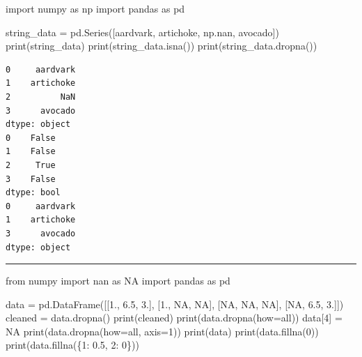 \documentclass[
  polish,
  letterpaper,
  DIV=11,
  numbers=noendperiod]{scrreprt}
\newenvironment{Shaded}{\begin{snugshade}}{\end{snugshade}}
\newcommand{\BuiltInTok}[1]{\textcolor[rgb]{0.00,0.23,0.31}{#1}}
\newcommand{\DecValTok}[1]{\textcolor[rgb]{0.68,0.00,0.00}{#1}}
\newcommand{\FloatTok}[1]{\textcolor[rgb]{0.68,0.00,0.00}{#1}}
\newcommand{\ImportTok}[1]{\textcolor[rgb]{0.00,0.46,0.62}{#1}}
\newcommand{\NormalTok}[1]{\textcolor[rgb]{0.00,0.23,0.31}{#1}}
\newcommand{\OperatorTok}[1]{\textcolor[rgb]{0.37,0.37,0.37}{#1}}
\newcommand{\StringTok}[1]{\textcolor[rgb]{0.13,0.47,0.30}{#1}}
\begin{document}
\begin{Shaded}
\begin{Highlighting}[]
\ImportTok{import}\NormalTok{ numpy }\ImportTok{as}\NormalTok{ np}
\ImportTok{import}\NormalTok{ pandas }\ImportTok{as}\NormalTok{ pd}

\NormalTok{string\_data }\OperatorTok{=}\NormalTok{ pd.Series([}\StringTok{\textquotesingle{}aardvark\textquotesingle{}}\NormalTok{, }\StringTok{\textquotesingle{}artichoke\textquotesingle{}}\NormalTok{, np.nan, }\StringTok{\textquotesingle{}avocado\textquotesingle{}}\NormalTok{])}
\BuiltInTok{print}\NormalTok{(string\_data)}
\BuiltInTok{print}\NormalTok{(string\_data.isna())}
\BuiltInTok{print}\NormalTok{(string\_data.dropna())}
\end{Highlighting}
\end{Shaded}

\begin{verbatim}
0     aardvark
1    artichoke
2          NaN
3      avocado
dtype: object
0    False
1    False
2     True
3    False
dtype: bool
0     aardvark
1    artichoke
3      avocado
dtype: object
\end{verbatim}

\begin{center}\rule{0.5\linewidth}{0.5pt}\end{center}

\begin{Shaded}
\begin{Highlighting}[]
\ImportTok{from}\NormalTok{ numpy }\ImportTok{import}\NormalTok{ nan }\ImportTok{as}\NormalTok{ NA}
\ImportTok{import}\NormalTok{ pandas }\ImportTok{as}\NormalTok{ pd}

\NormalTok{data }\OperatorTok{=}\NormalTok{ pd.DataFrame([[}\FloatTok{1.}\NormalTok{, }\FloatTok{6.5}\NormalTok{, }\FloatTok{3.}\NormalTok{], [}\FloatTok{1.}\NormalTok{, NA, NA],}
\NormalTok{                     [NA, NA, NA], [NA, }\FloatTok{6.5}\NormalTok{, }\FloatTok{3.}\NormalTok{]])}
\NormalTok{cleaned }\OperatorTok{=}\NormalTok{ data.dropna()}
\BuiltInTok{print}\NormalTok{(cleaned)}
\BuiltInTok{print}\NormalTok{(data.dropna(how}\OperatorTok{=}\StringTok{\textquotesingle{}all\textquotesingle{}}\NormalTok{))}
\NormalTok{data[}\DecValTok{4}\NormalTok{] }\OperatorTok{=}\NormalTok{ NA}
\BuiltInTok{print}\NormalTok{(data.dropna(how}\OperatorTok{=}\StringTok{\textquotesingle{}all\textquotesingle{}}\NormalTok{, axis}\OperatorTok{=}\DecValTok{1}\NormalTok{))}
\BuiltInTok{print}\NormalTok{(data)}
\BuiltInTok{print}\NormalTok{(data.fillna(}\DecValTok{0}\NormalTok{))}
\BuiltInTok{print}\NormalTok{(data.fillna(\{}\DecValTok{1}\NormalTok{: }\FloatTok{0.5}\NormalTok{, }\DecValTok{2}\NormalTok{: }\DecValTok{0}\NormalTok{\}))}
\end{Highlighting}
\end{Shaded}
\end{document}

